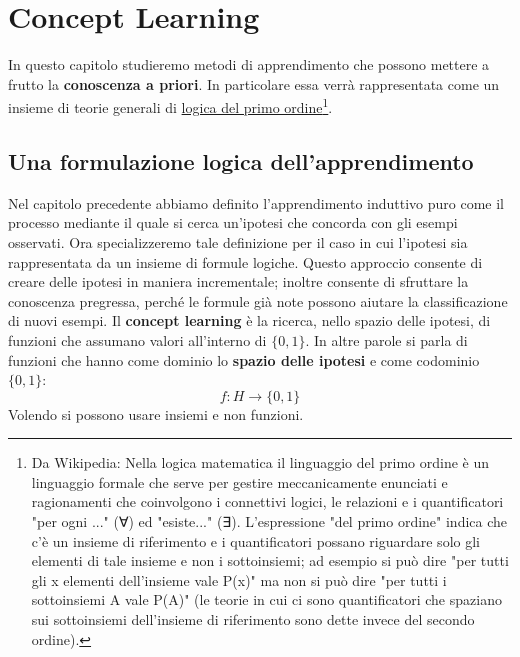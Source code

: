 \chapter{Concept Learning}
In questo capitolo studieremo metodi di apprendimento che possono mettere a frutto la \textbf{conoscenza a priori}. In particolare essa verrà rappresentata come un insieme di teorie generali di \href{https://it.wikipedia.org/wiki/Linguaggio_del_primo_ordine}{logica del primo ordine\footnote{Da Wikipedia: Nella logica matematica il linguaggio del primo ordine è un linguaggio formale che serve per gestire meccanicamente enunciati e ragionamenti che coinvolgono i connettivi logici, le relazioni e i quantificatori "per ogni ..." (∀) ed "esiste..." (∃). L'espressione "del primo ordine" indica che c'è un insieme di riferimento e i quantificatori possano riguardare solo gli elementi di tale insieme e non i sottoinsiemi; ad esempio si può dire "per tutti gli x elementi dell'insieme vale P(x)" ma non si può dire "per tutti i sottoinsiemi A vale P(A)" (le teorie in cui ci sono quantificatori che spaziano sui sottoinsiemi dell'insieme di riferimento sono dette invece del secondo ordine).}}.
\section{Una formulazione logica dell'apprendimento}
Nel capitolo precedente abbiamo definito l'apprendimento induttivo puro come il processo mediante il quale si cerca un'ipotesi che concorda con gli esempi osservati. Ora specializzeremo tale definizione per il caso in cui l'ipotesi sia rappresentata da un insieme di formule logiche. Questo approccio consente di creare delle ipotesi in maniera incrementale; inoltre consente di sfruttare la conoscenza pregressa, perché le formule già note possono aiutare la classificazione di nuovi esempi. Il \textbf{concept learning} è la ricerca, nello spazio delle ipotesi, di funzioni che assumano valori all'interno di $\{0, 1\}$. In altre parole si parla di funzioni che hanno come dominio lo \textbf{spazio delle ipotesi} e come codominio $\{0, 1\}$:
\[f:H\to\{0, 1\}\]
Volendo si possono usare insiemi e non funzioni.\\
